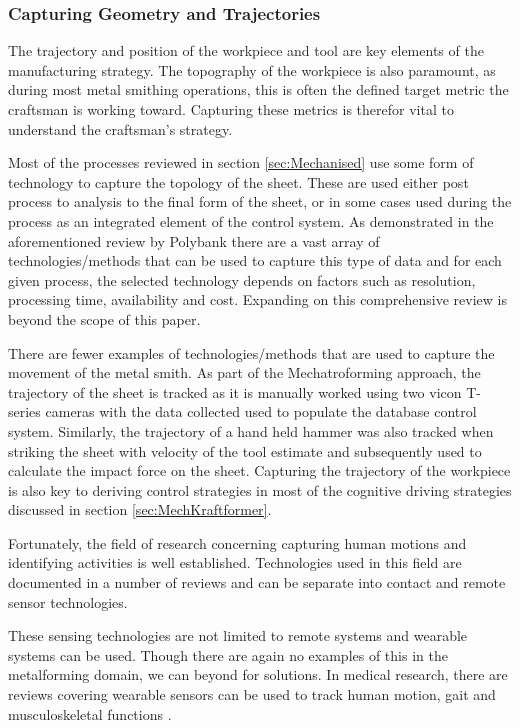\subsubsection{Capturing Geometry and Trajectories}
The trajectory and position of the workpiece and tool are key elements of the manufacturing strategy. The topography of the workpiece is also paramount, as during most metal smithing operations, this is often the defined target metric the craftsman is working toward. Capturing these metrics is therefor vital to understand the craftsman's strategy.

Most of the processes reviewed in section \ref{sec:Mechanised} use some form of technology to capture the topology of the sheet. These are used either post process to analysis to the final form of the sheet, or in some cases used during the process as an integrated element of the control system. As demonstrated in the aforementioned review by Polybank \citep{Allwood2016Closed-loopForming} there are a vast array of technologies/methods that can be used to capture this type of data and for each given process, the selected technology depends on factors such as resolution, processing time, availability and cost. Expanding on this comprehensive review is beyond the scope of this paper.

There are fewer examples of technologies/methods that are used to capture the movement of the metal smith. As part of the Mechatroforming approach, the trajectory of the sheet is tracked as it is manually worked  \citep{Ilangovan2016AnForming} using two vicon T-series cameras with the data collected used to populate the database control system. Similarly, the trajectory of a hand held hammer was also tracked when striking the sheet with velocity of the tool estimate and subsequently used to calculate the impact force on the sheet. Capturing the trajectory of the workpiece is also key to deriving control strategies in most of the cognitive driving strategies discussed in section \ref{sec:MechKraftformer}. 

Fortunately, the field of research concerning capturing human motions and identifying activities is well established. Technologies used in this field are documented in a number of reviews and can be separate into contact and remote sensor technologies. 


These sensing technologies are not limited to remote systems and wearable systems can be used. Though there are again no examples of this in the metalforming domain, we can beyond for solutions. In medical research, there are reviews covering wearable sensors can be used to track human motion, gait and musculoskeletal functions \citep{Homayounfar2020WearableChallenges}.

